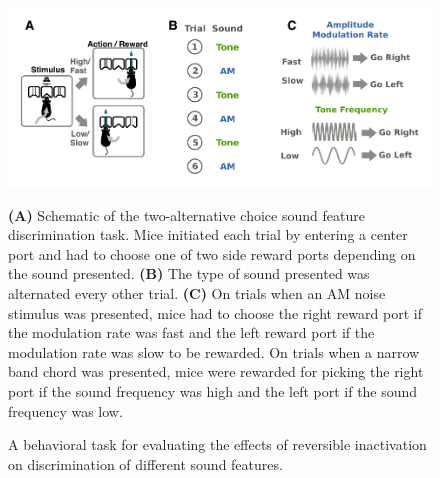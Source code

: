 \begin{figure}[hp] \begin{center}
	\includegraphics[width=6in]{figures/chapter4/figure_task} \end{center}
	\caption{A behavioral task for evaluating the effects of reversible
	inactivation on discrimination of different sound
	features.}{\textbf{(A)} Schematic of the two-alternative choice sound
	feature discrimination task. Mice initiated each trial by entering a
	center port and had to choose one of two side reward ports depending on
	the sound presented.
\textbf{(B)} The type of sound presented was alternated every other trial. 
%
\textbf{(C)} On trials when an AM noise stimulus was presented, mice had to
choose the right reward port if the modulation rate was fast and the left
reward port if the modulation rate was slow to be rewarded. On trials when a
narrow band chord was presented, mice were rewarded for picking the right port
if the sound frequency was high and the left port if the sound frequency was
low. 
%
}
\end{figure}

